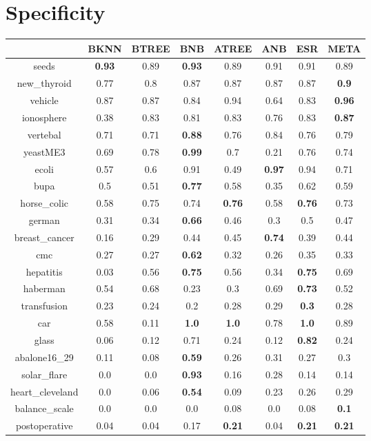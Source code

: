 \documentclass{article}%
\begin{document}
%
\section*{Specificity}%
\begin{tabular}{c|ccccccc}%
\hline%
&BKNN&BTREE&BNB&ATREE&ANB&ESR&META\\%
\hline%
seeds&\textbf{0.93}&0.89&\textbf{0.93}&0.89&0.91&0.91&0.89\\%
new\_thyroid&0.77&0.8&0.87&0.87&0.87&0.87&\textbf{0.9}\\%
vehicle&0.87&0.87&0.84&0.94&0.64&0.83&\textbf{0.96}\\%
ionosphere&0.38&0.83&0.81&0.83&0.76&0.83&\textbf{0.87}\\%
vertebal&0.71&0.71&\textbf{0.88}&0.76&0.84&0.76&0.79\\%
yeastME3&0.69&0.78&\textbf{0.99}&0.7&0.21&0.76&0.74\\%
ecoli&0.57&0.6&0.91&0.49&\textbf{0.97}&0.94&0.71\\%
bupa&0.5&0.51&\textbf{0.77}&0.58&0.35&0.62&0.59\\%
horse\_colic&0.58&0.75&0.74&\textbf{0.76}&0.58&\textbf{0.76}&0.73\\%
german&0.31&0.34&\textbf{0.66}&0.46&0.3&0.5&0.47\\%
breast\_cancer&0.16&0.29&0.44&0.45&\textbf{0.74}&0.39&0.44\\%
cmc&0.27&0.27&\textbf{0.62}&0.32&0.26&0.35&0.33\\%
hepatitis&0.03&0.56&\textbf{0.75}&0.56&0.34&\textbf{0.75}&0.69\\%
haberman&0.54&0.68&0.23&0.3&0.69&\textbf{0.73}&0.52\\%
transfusion&0.23&0.24&0.2&0.28&0.29&\textbf{0.3}&0.28\\%
car&0.58&0.11&\textbf{1.0}&\textbf{1.0}&0.78&\textbf{1.0}&0.89\\%
glass&0.06&0.12&0.71&0.24&0.12&\textbf{0.82}&0.24\\%
abalone16\_29&0.11&0.08&\textbf{0.59}&0.26&0.31&0.27&0.3\\%
solar\_flare&0.0&0.0&\textbf{0.93}&0.16&0.28&0.14&0.14\\%
heart\_cleveland&0.0&0.06&\textbf{0.54}&0.09&0.23&0.26&0.29\\%
balance\_scale&0.0&0.0&0.0&0.08&0.0&0.08&\textbf{0.1}\\%
postoperative&0.04&0.04&0.17&\textbf{0.21}&0.04&\textbf{0.21}&\textbf{0.21}\\%
\end{tabular}
\end{document}
